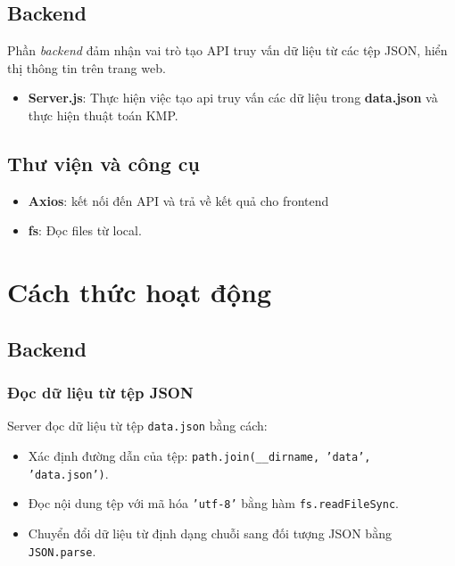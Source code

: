 \subsection{Backend}
Phần \textit{backend} đảm nhận vai trò tạo API truy vấn dữ liệu từ các tệp JSON, hiển thị thông tin trên trang web.
\begin{itemize}
    \item \textbf{Server.js}: Thực hiện việc tạo api truy vấn các dữ liệu trong \textbf{data.json} và thực hiện thuật toán KMP.
\end{itemize}
\subsection{Thư viện và công cụ}
\begin{itemize}
    \item \textbf{Axios}: kết nối đến API và trả về kết quả cho frontend
    \item \textbf{fs}: Đọc files từ local.
\end{itemize}  

\section{Cách thức hoạt động}
\subsection{Backend}
\subsubsection{Đọc dữ liệu từ tệp JSON}
Server đọc dữ liệu từ tệp \texttt{data.json} bằng cách:
\begin{itemize}
    \item Xác định đường dẫn của tệp: \texttt{path.join(\_\_dirname, 'data', 'data.json')}.
    \item Đọc nội dung tệp với mã hóa \texttt{'utf-8'} bằng hàm \texttt{fs.readFileSync}.
    \item Chuyển đổi dữ liệu từ định dạng chuỗi sang đối tượng JSON bằng \texttt{JSON.parse}.
\end{itemize}

